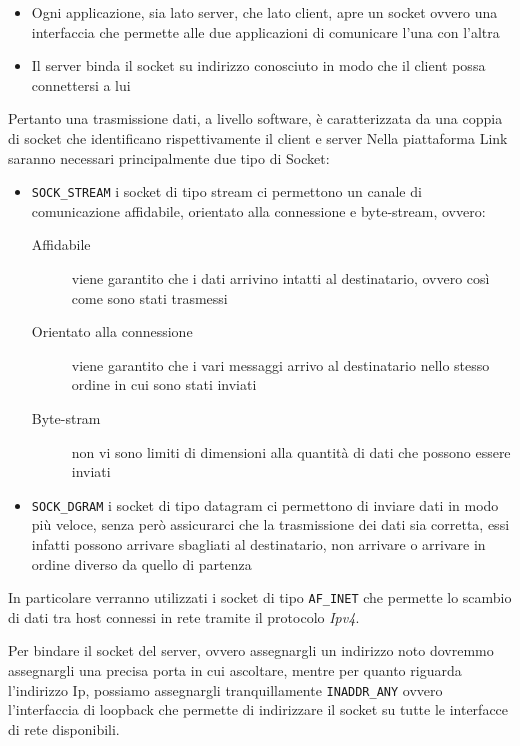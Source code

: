 \documentclass[11pt,fleqn]{book} %
\begin{document}
\begin{itemize}
	\item Ogni applicazione, sia lato server, che lato client, apre un socket ovvero una interfaccia che permette alle due applicazioni di comunicare l'una con l'altra
	\item Il server binda il socket su indirizzo conosciuto in modo che il client possa connettersi a lui
\end{itemize}
\medskip
Pertanto una trasmissione dati, a livello software, è caratterizzata da una coppia di socket che identificano rispettivamente il client e server
Nella piattaforma Link saranno necessari principalmente due tipo di Socket:
\medskip
\begin{itemize}
	\item  \texttt{SOCK\_STREAM} i socket di tipo stream ci permettono un canale di comunicazione affidabile, orientato alla connessione e byte-stream, ovvero:
	\begin{description}
		\item [Affidabile] viene garantito che i dati arrivino intatti al destinatario, ovvero così come sono stati trasmessi
		\item [Orientato alla connessione] viene garantito che i vari messaggi arrivo al destinatario nello stesso ordine in cui sono stati inviati
		\item [Byte-stram] non vi sono limiti di dimensioni alla quantità di dati che possono essere inviati
	\end{description}
	\obeylines
	\item	\texttt{SOCK\_DGRAM} i socket di tipo datagram ci permettono di inviare dati in modo più veloce, senza però assicurarci che la trasmissione dei dati sia corretta, essi infatti possono arrivare sbagliati al destinatario, non arrivare o arrivare in ordine diverso da quello di partenza
\end{itemize}
\medskip
\noindent In particolare verranno utilizzati i socket di tipo \texttt{AF\_INET} che permette lo scambio di dati tra host connessi in rete tramite il protocolo \textit{Ipv4}.

\noindent Per bindare il socket del server, ovvero assegnargli un indirizzo noto dovremmo assegnargli una precisa porta in cui ascoltare, mentre per quanto riguarda l'indirizzo Ip, possiamo assegnargli tranquillamente \texttt{INADDR\_ANY} ovvero l'interfaccia di loopback che permette di indirizzare il socket su tutte le interfacce di rete disponibili.

\end{document}

